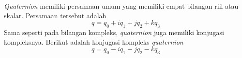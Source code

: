 \textit{Quaternion} memiliki persamaan umum yang memiliki empat bilangan riil atau skalar. Persamaan tersebut adalah 
\[
	q = q_0 + i q_1 + j q_2 + k q_3
\]\cite{kuipers:1999}
Sama seperti pada bilangan kompleks, \textit{quaternion} juga memiliki konjugasi kompleksnya. Berikut adalah konjugasi kompleks \textit{quaternion}
\[
	q = q_0 - i q_1 - j q_2 - k q_3
\]